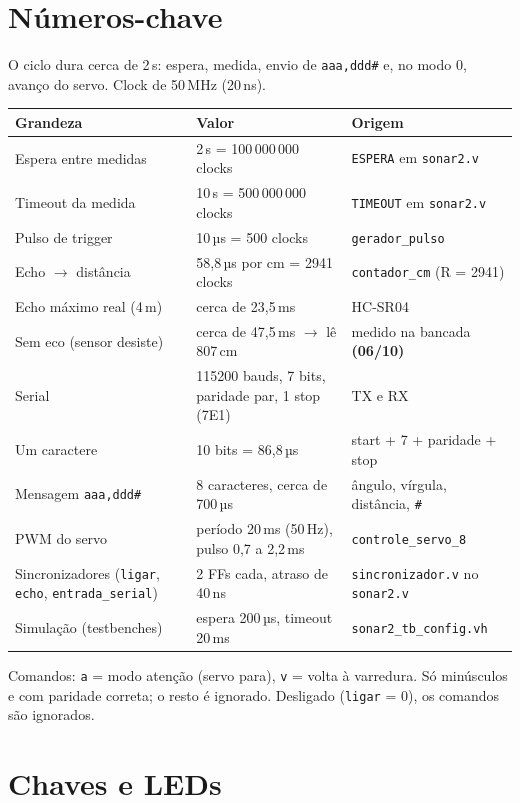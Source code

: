 \documentclass[9pt,a4paper]{extarticle}
\newcommand{\s}[1]{\texttt{#1}}          %
\newcommand{\bancada}{\textcolor{red!70!black}{\textbf{(06/10)}}}
\begin{document}
\clearpage
\section{Números-chave}

O ciclo dura cerca de 2\,s: espera, medida, envio de \s{aaa,ddd\#} e, no modo 0,
avanço do servo. Clock de 50\,MHz (20\,ns).

\begin{tabularx}{\linewidth}{@{}l l Y@{}}
\toprule
Grandeza & Valor & Origem \\
\midrule
Espera entre medidas & 2\,s = 100\,000\,000 clocks & \s{ESPERA} em \s{sonar2.v} \\
Timeout da medida & 10\,s = 500\,000\,000 clocks & \s{TIMEOUT} em \s{sonar2.v} \\
Pulso de trigger & 10\,µs = 500 clocks & \s{gerador\_pulso} \\
Echo $\to$ distância & 58,8\,µs por cm = 2941 clocks & \s{contador\_cm} (R = 2941) \\
Echo máximo real (4\,m) & cerca de 23,5\,ms & HC-SR04 \\
Sem eco (sensor desiste) & cerca de 47,5\,ms $\to$ lê 807\,cm & medido na bancada \bancada \\
Serial & 115200 bauds, 7 bits, paridade par, 1 stop (7E1) & TX e RX \\
Um caractere & 10 bits = 86,8\,µs & start + 7 + paridade + stop \\
Mensagem \s{aaa,ddd\#} & 8 caracteres, cerca de 700\,µs & ângulo, vírgula, distância, \s{\#} \\
PWM do servo & período 20\,ms (50\,Hz), pulso 0,7 a 2,2\,ms & \s{controle\_servo\_8} \\
Sincronizadores (\s{ligar}, \s{echo}, \s{entrada\_serial}) & 2 FFs cada, atraso de 40\,ns & \s{sincronizador.v} no \s{sonar2.v} \\
Simulação (testbenches) & espera 200\,µs, timeout 20\,ms & \s{sonar2\_tb\_config.vh} \\
\bottomrule
\end{tabularx}

Comandos: \s{a} = modo atenção (servo para), \s{v} = volta à varredura. Só
minúsculos e com paridade correta; o resto é ignorado. Desligado
(\s{ligar} = 0), os comandos são ignorados.

\section{Chaves e LEDs}
\end{document}
